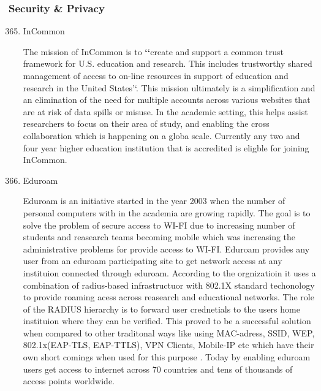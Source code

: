 \subsubsection{Security \& Privacy}
\label{\detokenize{i524/technologies:security-privacy}}\begin{enumerate}
\setcounter{enumi}{364}
\item {} 
InCommon

The mission of InCommon is to {\color{red}\bfseries{}{}`{}`}create and support a common trust
framework for U.S. education and research.  This includes
trustworthy shared management of access to on-line resources in
support of education and research in the United
States'`. \label{\detokenize{i524/technologies:id671}}{\hyperref[\detokenize{i524/technologies:www-incommon}]{\sphinxcrossref{{[}582{]}}}} This mission ultimately is a
simplification and an elimination of the need for multiple
accounts across various websites that are at risk of data spills
or misuse.  In the academic setting, this helps assist
researchers to focus on their area of study, and enabling the
cross collaboration which is happening on a globa scale.
Currently any two and four year higher education institution that
is accredited is eligble for joining InCommon.

\item {} 
Eduroam \label{\detokenize{i524/technologies:id672}}{\hyperref[\detokenize{i524/technologies:www-eduroam}]{\sphinxcrossref{{[}583{]}}}}

Eduroam is an initiative started in the year 2003 when the number
of personal computers with in the academia are growing
rapidly. The goal is to solve the problem of secure access to
WI-FI due to increasing number of students and reasearch teams
becoming mobile which was increasing the administrative problems
for provide access to WI-FI. Eduroam provides any user from an
eduroam participating site to get network access at any
instituion connected through eduroam. According to the
orgnizatioin it uses a combination of radius-based infrastructuor
with 802.1X standard techonology to provide roaming acess across
reasearch and educational networks. The role of the RADIUS
hierarchy is to forward user crednetials to the users home
instituion where they can be verified. This proved to be a
successful solution when compared to other traditonal ways like
using MAC-adress, SSID, WEP, 802.1x(EAP-TLS, EAP-TTLS), VPN
Clients, Mobile-IP etc which have their own short comings when
used for this purpose \label{\detokenize{i524/technologies:id673}}{\hyperref[\detokenize{i524/technologies:eduroam-paper-2005}]{\sphinxcrossref{{[}584{]}}}}. Today by
enabling eduroam users get access to internet across 70 countries
and tens of thousands of access points worldwide.


\end{enumerate}
